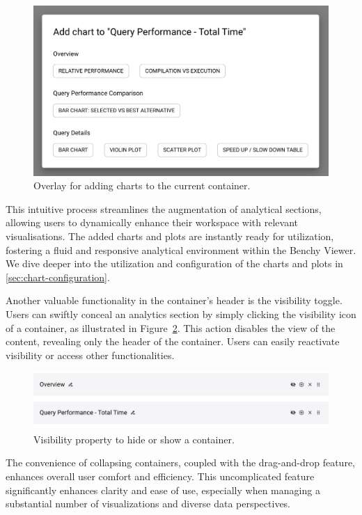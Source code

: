 \begin{figure}[h]
  \centering
  \includegraphics[width=0.6\linewidth]{figures/analytics-add-chart.png}
  \caption{Overlay for adding charts to the current container.}
  \label{fig:analytics-add-chart}
\end{figure}

This intuitive process streamlines the augmentation of analytical sections, allowing users to dynamically enhance their workspace with relevant visualisations. The added charts and plots are instantly ready for utilization, fostering a fluid and responsive analytical environment within the Benchy Viewer.\\
We dive deeper into the utilization and configuration of the charts and plots in \ref{sec:chart-configuration}.


Another valuable functionality in the container's header is the visibility toggle. Users can swiftly conceal an analytics section by simply clicking the visibility icon of a container, as illustrated in Figure~\ref{fig:analytics-section-visibility}. This action disables the view of the content, revealing only the header of the container. Users can easily reactivate visibility or access other functionalities.

\begin{figure}[h]
  \centering
  \includegraphics[width=0.8\linewidth]{figures/analytics-section-visibility.png}
  \caption{Visibility property to hide or show a container.}
  \label{fig:analytics-section-visibility}
\end{figure}

The convenience of collapsing containers, coupled with the drag-and-drop feature, enhances overall user comfort and efficiency. This uncomplicated feature significantly enhances clarity and ease of use, especially when managing a substantial number of visualizations and diverse data perspectives.

